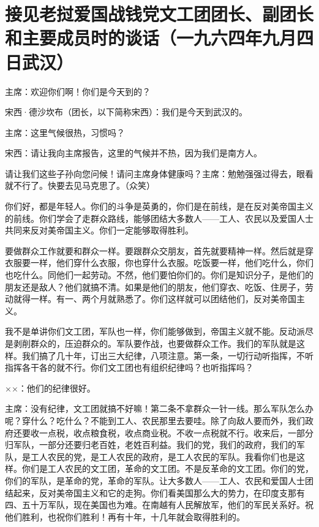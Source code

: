 \section[接见老挝爱国战钱党文工团团长、副团长和主要成员时的谈话（一九六四年九月四日武汉）]{接见老挝爱国战钱党文工团团长、副团长和主要成员时的谈话（一九六四年九月四日武汉）}


主席：欢迎你们啊！你们是今天到的？

宋西·德沙坎布（团长，以下简称宋西）：我们是今天到武汉的。

主席：这里气候很热，习惯吗？

宋西：请让我向主席报告，这里的气候并不热，因为我们是南方人。

请让我们这些子孙向您问候！请问主席身体健康吗？主席：勉勉强强过得去，眼看就不行了。快要去见马克思了。（众笑）

你们好，都是年轻人。你们的斗争是英勇的，你们是在前线，是在反对美帝国主义的前线。你们学会了走群众路线，能够团结大多数人——工人、农民以及爱国人士共同来反对美帝国主义。你们一定能够取得胜利。

要做群众工作就要和群众一样。要跟群众交朋友，首先就要精神一样。然后就是穿衣服要一样，他们穿什么衣服，你也穿什么衣服。吃饭要一样，他们吃什么，你们也吃什么。同他们一起劳动。不然，他们要怕你们的。你们是知识分子，是他们的朋友还是敌人？他们就搞不清。如果是他们的朋友，他们穿衣、吃饭、住房子，劳动就得一样。有一、两个月就熟悉了。你们这样就可以团结他们，反对美帝国主义。

我不是单讲你们文工团，军队也一样，你们能够做到，帝国主义就不能。反动派尽是剥削群众的，压迫群众的。军队要作战，也要做群众工作。我们的军队就是这样。我们搞了几十年，订出三大纪律，八项注意。第一条，一切行动听指挥，不听指挥各干各的就不行。你们文工团也有组织纪律吗？也听指挥吗？

××：他们的纪律很好。

主席：没有纪律，文工团就搞不好嘛！第二条不拿群众一针一线。那么军队怎么办呢？穿什么？吃什么？不能到工人、农民那里去要哇。除了向敌人要而外，我们政府还要收一点税，收点粮食税，收点商业税。不收一点税就不行。收来后，一部分归军队，一部分还要归老百姓，老姓百利益。我们的党，我们的政府，我们的军队，是工人农民的党，是工人农民的政府，是工人农民的军队。我看你们也是这样。你们是工人农民的文工团，革命的文工团。不是反革命的文工团。你们的党，你们的军队，是革命的党，革命的军队。让大多数人——工人、农民和爱国人士团结起来，反对美帝国主义和它的走狗。你们看美国那么大的势力，在印度支那有四、五十万军队，现在美国也为难。在南越有人民解放军，他们的军民关系好。祝他们胜利，也祝你们胜利！再有十年，十几年就会取得胜利的。

